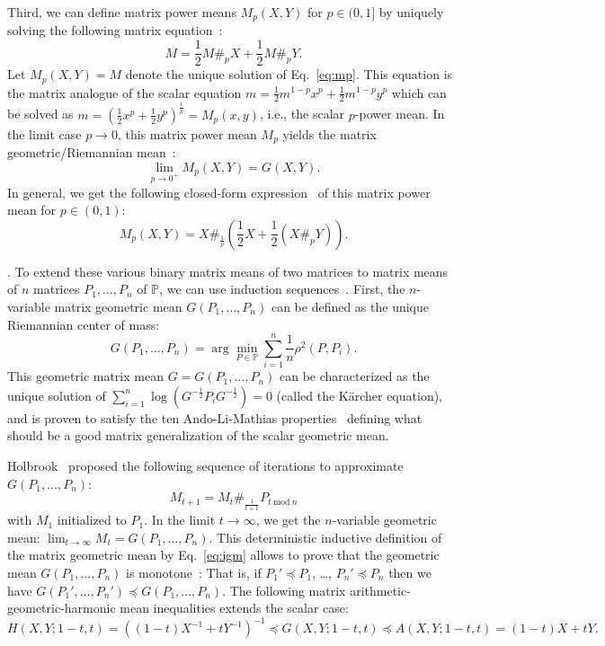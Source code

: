 \documentclass{article}
\def\mod{\mathrm{mod}}
\def\bbP{\mathbb{P}}
\begin{document}
Third, we can define matrix power means $M_p(X,Y)$ for $p\in (0,1]$  
by uniquely solving the following matrix equation~\cite{lim2012matrix}:
\begin{equation}\label{eq:mp}
M=\frac{1}{2} M\#_p X + \frac{1}{2}  M\#_p Y.
\end{equation}
Let $M_p(X,Y)=M$ denote the unique solution of Eq.~\ref{eq:mp}.
This equation is the matrix analogue of the scalar equation $m=\frac{1}{2} m^{1-p}x^p + \frac{1}{2} m^{1-p}y^p$  which can be solved as 
$m=\left(\frac{1}{2}x^p+\frac{1}{2}y^p\right)^{\frac{1}{p}}=M_p(x,y)$, i.e., the scalar $p$-power mean.
In the limit case $p\rightarrow 0$, this matrix power mean $M_p$ yields the matrix geometric/Riemannian mean~\cite{lim2012matrix}: 
$$
\lim_{p\rightarrow 0^+} M_p(X,Y)=G(X,Y). 
$$
In general, we get the following closed-form expression~\cite{lim2012matrix} of  this matrix power mean for $p\in (0,1)$:
$$
M_p(X,Y)= X \#_{\frac{1}{p}}\left (\frac{1}{2}X+ \frac{1}{2}(X \#_p Y)\right).
$$

\vskip 0.3cm
.
To extend these various binary matrix means of two matrices  to matrix means of $n$ matrices $P_1,\ldots, P_n$ of $\bbP$, we can use induction sequences~\cite{RecursiveFrechetMeanNPC-2016}.
First, the $n$-variable matrix geometric mean $G(P_1,\ldots, P_n)$ can be defined as the unique Riemannian center of mass:
$$
G(P_1,\ldots, P_n)= \arg\min_{P\in\bbP} \sum_{i=1}^n \frac{1}{n}\rho^2(P,P_i).
$$
This geometric matrix mean $G=G(P_1,\ldots, P_n)$ can be characterized as the unique solution of 
$\sum_{i=1}^n \log\left(G^{-\frac{1}{2}}P_iG^{-\frac{1}{2}}\right)=0$ (called the K\"archer equation), and is proven to satisfy the ten Ando-Li-Mathias properties~\cite{ALM-2004} defining what should be a good matrix generalization of the scalar geometric mean.

Holbrook~\cite{holbrook2012no} proposed the following sequence of iterations to approximate  $G(P_1,\ldots, P_n)$:
\begin{equation}\label{eq:igm}
M_{t+1}=M_t \#_{\frac{1}{t+1}} P_{t\ \mod\ n}
\end{equation}
with $M_1$ initialized to $P_1$.
In the limit $t\rightarrow\infty$, we get the $n$-variable geometric mean: $\lim_{t\rightarrow\infty} M_t=G(P_1,\ldots,P_n)$.
This deterministic inductive definition of the matrix geometric mean by Eq.~\ref{eq:igm} allows to prove that 
the geometric mean $G(P_1,\ldots,P_n)$ is monotone~\cite{holbrook2012no}:
That is, if $P_1'\preceq P_1$, \ldots, $P_n'\preceq P_n$ then we have
$G(P_1',\ldots,P_n')\preceq G(P_1,\ldots,P_n)$.
The following matrix  arithmetic-geometric-harmonic mean inequalities extends the scalar case: 
$$
{H(X,Y;1-t,t)=((1-t)X^{-1}+tY^{-1})^{-1} \preceq G(X,Y;1-t,t) \preceq A(X,Y;1-t,t)=(1-t)X+tY}.
$$
 
\end{document}
